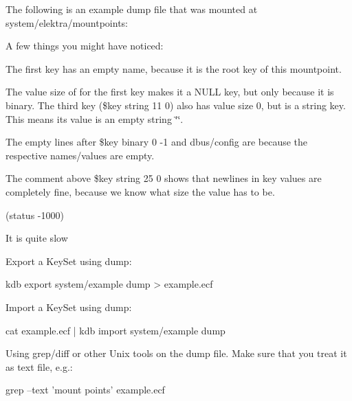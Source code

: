 The following is an example {\ttfamily dump} file that was mounted at {\ttfamily system/elektra/mountpoints}\+:




A few things you might have noticed\+:


\begin{DoxyItemize}
\item The first key has an empty name, because it is the root key of this mountpoint.
\item The value size of {} for the first key makes it a {\ttfamily N\+U\+LL} key, but only because it is {\ttfamily binary}. The third key ({\ttfamily \$key string 11 0}) also has value size 0, but is a {\ttfamily string} key. This means its value is an empty string {\ttfamily \char`\"{}\char`\"{}}.
\item The empty lines after {\ttfamily \$key binary 0 -\/1} and {\ttfamily dbus/config} are because the respective names/values are empty.
\item The comment above {\ttfamily \$key string 25 0} shows that newlines in key values are completely fine, because we know what size the value has to be.
\end{DoxyItemize}

(status -\/1000)


\begin{DoxyItemize}
\item It is quite slow
\end{DoxyItemize}

Export a Key\+Set using {\ttfamily dump}\+:


\begin{DoxyCode}
kdb export system/example dump > example.ecf
\end{DoxyCode}


Import a Key\+Set using {\ttfamily dump}\+:


\begin{DoxyCode}
cat example.ecf | kdb import system/example dump
\end{DoxyCode}


Using grep/diff or other Unix tools on the dump file. Make sure that you treat it as text file, e.\+g.\+:


\begin{DoxyCode}
grep --text 'mount points' example.ecf
\end{DoxyCode}
 